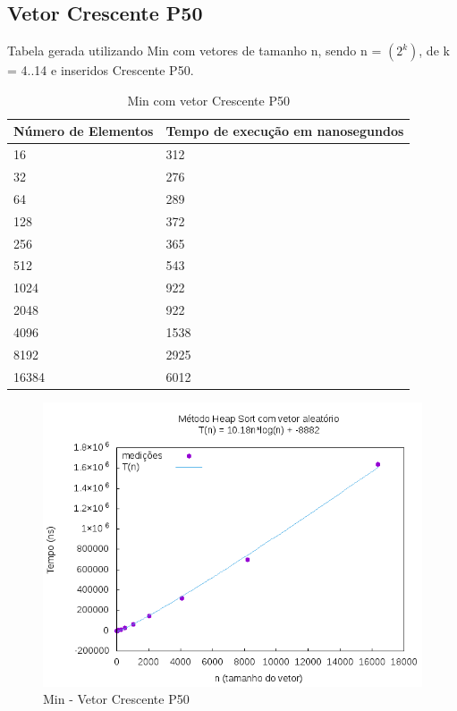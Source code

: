 \documentclass[12pt,a4paper,twoside]{report}
\begin{document}
\subsection{Vetor Crescente P50}
Tabela gerada utilizando Min com vetores de tamanho n, sendo n = $(2^k)$, de k = 4..14 e inseridos Crescente P50.
\begin{table}[H]
\centering
\caption{Min com vetor Crescente P50}
\label{my-label}
\begin{tabular}{|l|l|}
\hline
\multicolumn{1}{|c|}{\textbf{Número de Elementos}} & \multicolumn{1}{c|}{\textbf{Tempo de execução em nanosegundos}} \\ \hline
16 & 312 \\ \hline
32 & 276 \\ \hline
64 & 289 \\ \hline
128 & 372 \\ \hline
256 & 365 \\ \hline
512 & 543 \\ \hline
1024 & 922 \\ \hline
2048 & 922 \\ \hline
4096 & 1538 \\ \hline
8192 & 2925 \\ \hline
16384 & 6012 \\ \hline

\end{tabular}
\end{table}

\begin{figure}[H]
    \centering
    \includegraphics[width=0.7\linewidth]{graficos/HeapSort/vIntAleatorio/vIntAleatorio.png}
  \caption{Min - Vetor Crescente P50}
\end{figure}
\end{document}
